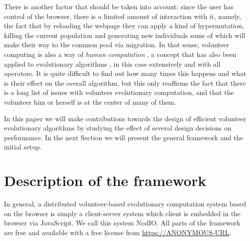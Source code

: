 \documentclass[runningheads,a4paper]{llncs}\usepackage[]{graphicx}\usepackage[]{color}
\begin{document}
There is another factor that should be taken into account: since the
user has control of the browser, there is a limited amount of
interaction with it, namely, the fact that by reloading the webpage they
can apply a kind of hypermutation, killing the current population and
generating new individuals some of which will make their way to the
common pool via migration. In that sense, volunteer computing is also
a way of {\em human computation} \cite{quinn2011human}, a concept that
has also been applied to evolutionary algorithms \cite{972056}, in
this case extensively and with all operators. It is quite difficult to
find out how many times this happens and what is their effect on the
overall algorithm, but this only reaffirms the fact that there is a
long list of issues with volunteer evolutionary computation, and that
the volunteer him or herself is at the center of many of them.

In this paper we will make contributions towards the design of
efficient volunteer evolutionary algorithms by studying the effect of
several design decisions on performance. In the next Section we will
present the general framework and the initial setup.


\section{Description of the framework}
\label{sec:description}

In general, a distributed volunteer-based evolutionary computation
system based on the browser is simply a client-server system
which client is embedded in the browser via JavaScript. We call this
system {\sf NodIO}. All parts of the framework are free and available
with a free license from \url{https://ANONYMOUS-URL}.
\end{document}
